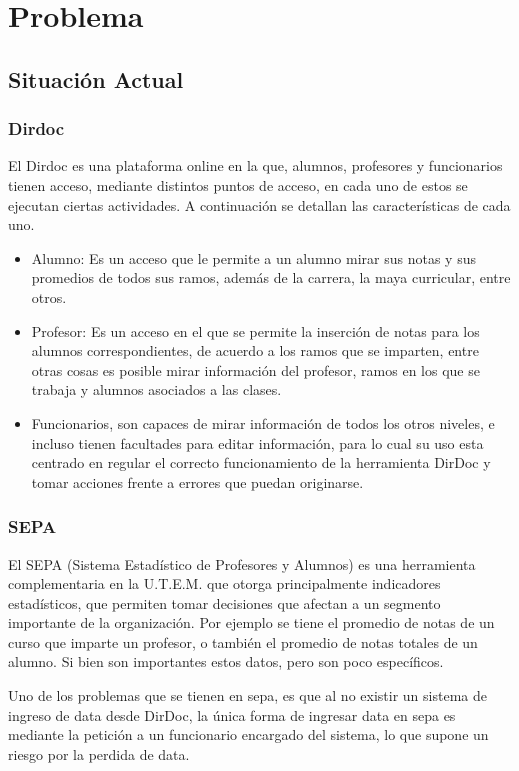 \documentclass[a4paper,12pt,openany,oneside]{book}
\begin{document}
\chapter{Problema}
\thispagestyle{empty}
\section{Situación Actual}
\subsection{Dirdoc}
El Dirdoc es una plataforma online en la que, alumnos, profesores y funcionarios tienen acceso, mediante distintos puntos de acceso, en cada uno de estos se ejecutan ciertas actividades. A continuación se detallan las características de cada uno.

\begin{itemize}
	\item Alumno: Es un acceso que le permite a un alumno mirar sus notas y sus promedios de todos sus ramos, además de la carrera, la maya curricular, entre otros.
	\item Profesor: Es un acceso en el que se permite la inserción de notas para los alumnos correspondientes, de acuerdo a los ramos que se imparten, entre otras cosas es posible mirar información del profesor, ramos en los que se trabaja y alumnos asociados a las clases.
	\item Funcionarios, son capaces de mirar información de todos los otros niveles, e incluso tienen facultades para editar información, para lo cual su uso esta centrado en regular el correcto funcionamiento de la herramienta DirDoc y tomar acciones frente a errores que puedan originarse.
\end{itemize}

\subsection{SEPA}
El SEPA (Sistema Estadístico de Profesores y Alumnos) es una herramienta complementaria en la U.T.E.M. que otorga principalmente indicadores estadísticos, que permiten tomar decisiones que afectan a un segmento importante de la organización. Por ejemplo se tiene el promedio de notas de un curso que imparte un profesor, o también el promedio de notas totales de un alumno. Si bien son importantes estos datos, pero son poco específicos.

Uno de los problemas que se tienen en sepa, es que al no existir un sistema de ingreso de data desde DirDoc, la única forma de ingresar data en sepa es mediante la petición a un funcionario encargado del sistema, lo que supone un riesgo por la perdida de data.
\end{document}
